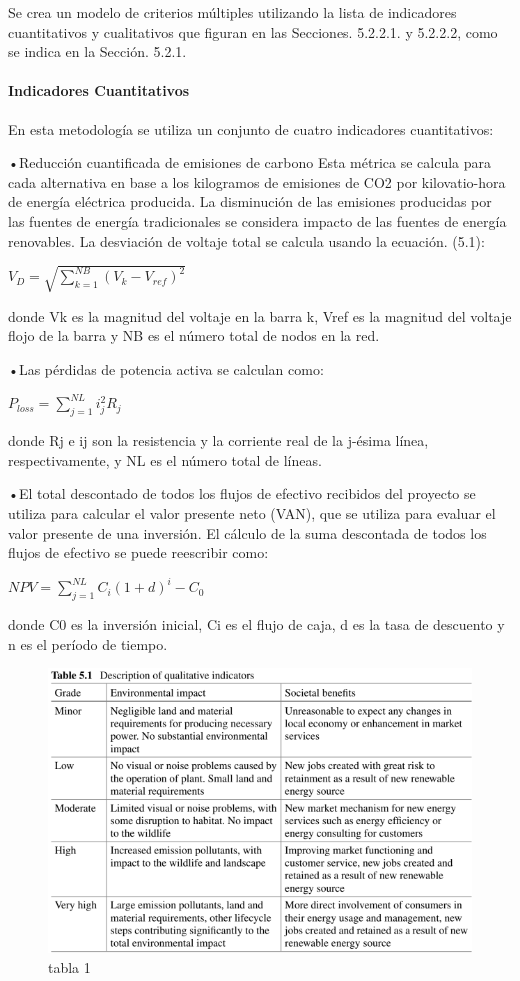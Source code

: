 \documentclass[
]{article}
\begin{document}
Se crea un modelo de criterios múltiples utilizando la lista de
indicadores cuantitativos y cualitativos que figuran en las Secciones.
5.2.2.1. y 5.2.2.2, como se indica en la Sección. 5.2.1.

\hypertarget{indicadores-cuantitativos}{%
\paragraph{Indicadores Cuantitativos}\label{indicadores-cuantitativos}}

En esta metodología se utiliza un conjunto de cuatro indicadores
cuantitativos:

•Reducción cuantificada de emisiones de carbono Esta métrica se calcula
para cada alternativa en base a los kilogramos de emisiones de CO2 por
kilovatio-hora de energía eléctrica producida. La disminución de las
emisiones producidas por las fuentes de energía tradicionales se
considera impacto de las fuentes de energía renovables. La desviación de
voltaje total se calcula usando la ecuación. (5.1):

\(V_D = \sqrt {\sum_{k=1}^{NB} (V_k - V_{ref})^2}\)

donde Vk es la magnitud del voltaje en la barra k, Vref es la magnitud
del voltaje flojo de la barra y NB es el número total de nodos en la
red.

•Las pérdidas de potencia activa se calculan como:

\(P_{loss}=\sum_{j=1}^{NL}i^2_jR_j\)

donde Rj e ij son la resistencia y la corriente real de la j-ésima
línea, respectivamente, y NL es el número total de líneas.

•El total descontado de todos los flujos de efectivo recibidos del
proyecto se utiliza para calcular el valor presente neto (VAN), que se
utiliza para evaluar el valor presente de una inversión. El cálculo de
la suma descontada de todos los flujos de efectivo se puede reescribir
como:

\(NPV=\sum_{j=1}^{NL}C_i (1+d)^i - C_0\)

donde C0 es la inversión inicial, Ci es el flujo de caja, d es la tasa
de descuento y n es el período de tiempo.

\begin{figure}
\centering
\includegraphics{fotos/tabla5.1.png}
\caption{tabla 1}
\end{figure}
\end{document}
